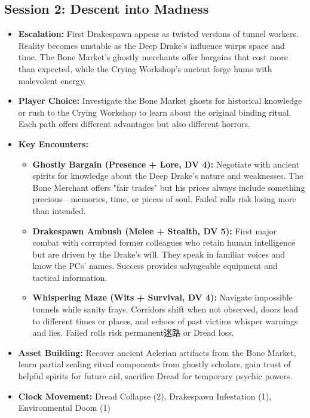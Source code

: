 \documentclass[11pt]{article}
\begin{document}
\subsection{Session 2: Descent into Madness}
\begin{itemize}
\item \textbf{Escalation:} First Drakespawn appear as twisted versions of tunnel workers. Reality becomes unstable as the Deep Drake's influence warps space and time. The Bone Market's ghostly merchants offer bargains that cost more than expected, while the Crying Workshop's ancient forge hums with malevolent energy.
\item \textbf{Player Choice:} Investigate the Bone Market ghosts for historical knowledge or rush to the Crying Workshop to learn about the original binding ritual. Each path offers different advantages but also different horrors.
\item \textbf{Key Encounters:}
  \begin{itemize}
  \item \textbf{Ghostly Bargain (Presence + Lore, DV 4):} Negotiate with ancient spirits for knowledge about the Deep Drake's nature and weaknesses. The Bone Merchant offers "fair trades" but his prices always include something precious—memories, time, or pieces of soul. Failed rolls risk losing more than intended.
  \item \textbf{Drakespawn Ambush (Melee + Stealth, DV 5):} First major combat with corrupted former colleagues who retain human intelligence but are driven by the Drake's will. They speak in familiar voices and know the PCs' names. Success provides salvageable equipment and tactical information.
  \item \textbf{Whispering Maze (Wits + Survival, DV 4):} Navigate impossible tunnels while sanity frays. Corridors shift when not observed, doors lead to different times or places, and echoes of past victims whisper warnings and lies. Failed rolls risk permanent迷路 or Dread loss.
  \end{itemize}
\item \textbf{Asset Building:} Recover ancient Aelerian artifacts from the Bone Market, learn partial sealing ritual components from ghostly scholars, gain trust of helpful spirits for future aid, sacrifice Dread for temporary psychic powers.
\item \textbf{Clock Movement:} Dread Collapse (2), Drakespawn Infestation (1), Environmental Doom (1)
\end{itemize}
\end{document}
